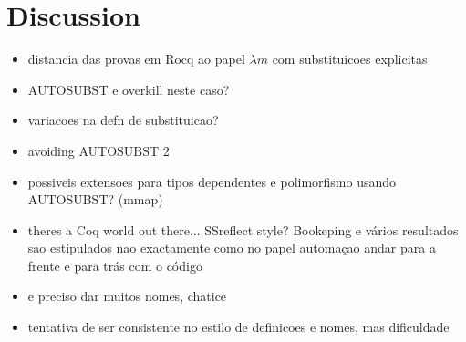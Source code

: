 \chapter{Discussion}
\label{c:discussion}

\begin{itemize}

  
\item distancia das provas em Rocq ao papel
  \subitem $\lambda m$ com substituicoes explicitas
  
\item AUTOSUBST e overkill neste caso?
\item variacoes na defn de substituicao?
\item avoiding AUTOSUBST 2

\item possiveis extensoes para tipos dependentes e polimorfismo usando AUTOSUBST? (mmap)

\item theres a Coq world out there...
  \subitem SSreflect style? Bookeping e vários resultados sao estipulados nao exactamente como no papel
  \subitem automaçao
  \subitem andar para a frente e para trás com o código 

\item e preciso dar muitos nomes, chatice
\item tentativa de ser consistente no estilo de definicoes e nomes, mas dificuldade
  
\end{itemize}

